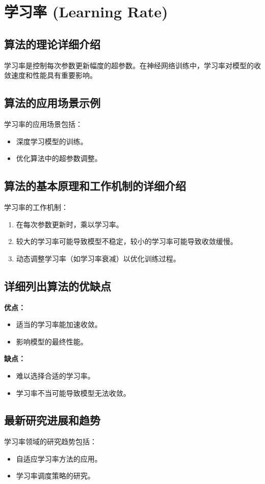 \section{学习率 (Learning Rate)}
\subsection*{算法的理论详细介绍}
学习率是控制每次参数更新幅度的超参数。在神经网络训练中，学习率对模型的收敛速度和性能具有重要影响。

\subsection*{算法的应用场景示例}
学习率的应用场景包括：
\begin{itemize}
    \item 深度学习模型的训练。
    \item 优化算法中的超参数调整。
\end{itemize}

\subsection*{算法的基本原理和工作机制的详细介绍}
学习率的工作机制：
\begin{enumerate}
    \item 在每次参数更新时，乘以学习率。
    \item 较大的学习率可能导致模型不稳定，较小的学习率可能导致收敛缓慢。
    \item 动态调整学习率（如学习率衰减）以优化训练过程。
\end{enumerate}

\subsection*{详细列出算法的优缺点}
\textbf{优点：}
\begin{itemize}
    \item 适当的学习率能加速收敛。
    \item 影响模型的最终性能。
\end{itemize}

\textbf{缺点：}
\begin{itemize}
    \item 难以选择合适的学习率。
    \item 学习率不当可能导致模型无法收敛。
\end{itemize}

\subsection*{最新研究进展和趋势}
学习率领域的研究趋势包括：
\begin{itemize}
    \item 自适应学习率方法的应用。
    \item 学习率调度策略的研究。
\end{itemize}
